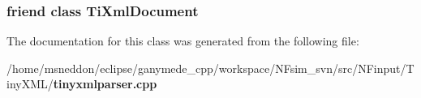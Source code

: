 \subsubsection{\setlength{\rightskip}{0pt plus 5cm}friend class {\bf TiXmlDocument}\hspace{0.3cm}{\tt  [friend]}}\label{classTiXmlParsingData_173617f6dfe902cf484ce5552b950475}




The documentation for this class was generated from the following file:\begin{CompactItemize}
\item 
/home/msneddon/eclipse/ganymede\_\-cpp/workspace/NFsim\_\-svn/src/NFinput/TinyXML/{\bf tinyxmlparser.cpp}\end{CompactItemize}
